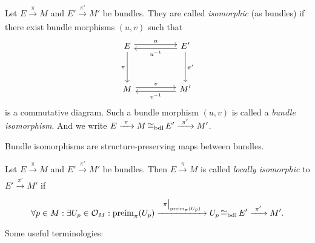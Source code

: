 \begin{definition}\label{def:bundle-isomorphism}
	Let \(E \xrightarrow[]{\ \pi\ } M\) and \(E' \xrightarrow[]{\ \pi'\ } M'\) be bundles. They are called \emph{isomorphic} (as bundles) if there exist bundle morphisms \((u, v)\) such that
	\begin{equation}
		\begin{tikzcd}
			E \arrow[rr,shift left,"u"] \arrow[dd,"\pi"'] & & E' \arrow[ll,shift left,"u^{-1}"] \arrow[dd,"\pi'"] \\
			& & \\
			M \arrow[rr,shift left,"v"] & & M' \arrow[ll,shift left,"v^{-1}"]
		\end{tikzcd}
	\end{equation}
	is a commutative diagram. Such a bundle morphism \((u, v)\) is called a \emph{bundle isomorphism}. And we write \(E \xrightarrow[]{\ \pi\ } M \operatorname{\cong_{\text{bdl}}} E' \xrightarrow[]{\ \pi'\ } M'\).
\end{definition}

Bundle isomorphisms are structure-preserving maps between bundles.

\begin{definition}
	Let \(E \xrightarrow[]{\ \pi\ } M\) and \(E' \xrightarrow[]{\ \pi'\ } M'\) be bundles. Then \(E \xrightarrow[]{\ \pi\ } M\) is called \emph{locally isomorphic} to \(E' \xrightarrow[]{\ \pi'\ } M'\) if
	\begin{equation}
		\forall p \in M: \exists U_p \in \O_M: \preimg_{\pi}(U_p) \xrightarrow[]{\ \eval{\pi}_{\preimg_{\pi}(U_p)}\ } U_p \bdlIso E' \xrightarrow[]{\ \pi'\ } M'.
	\end{equation}
\end{definition}

Some useful terminologies:
